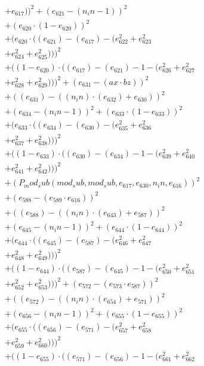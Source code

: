 \documentclass[10pt, a4paper]{article}
\begin{document}
\begin{align*}
& + e_{617}))^{2} + (e_{621} - (n_in - 1))^{2} \\
& + (e_{620}  \cdot  (1 - e_{620}))^{2} \\
& + (e_{620}  \cdot  ((e_{621}) - (e_{617}) - (e_{622}^{2} + e_{623}^{2} \\
& + e_{624}^{2} + e_{625}^{2})))^{2} \\
& + ((1 - e_{620})  \cdot  ((e_{617}) - (e_{621}) - 1 - (e_{626}^{2} + e_{627}^{2} \\
& + e_{628}^{2} + e_{629}^{2})))^{2} + (e_{631} - (ax  \cdot  bz))^{2} \\
& + ((e_{631}) - ((n_in)  \cdot  (e_{632}) + e_{630}))^{2} \\
& + (e_{634} - (n_in - 1))^{2} + (e_{633}  \cdot  (1 - e_{633}))^{2} \\
& + (e_{633}  \cdot  ((e_{634}) - (e_{630}) - (e_{635}^{2} + e_{636}^{2} \\
& + e_{637}^{2} + e_{638}^{2})))^{2} \\
& + ((1 - e_{633})  \cdot  ((e_{630}) - (e_{634}) - 1 - (e_{639}^{2} + e_{640}^{2} \\
& + e_{641}^{2} + e_{642}^{2})))^{2} \\
& + (P_mod_sub(mod_sub, mod_sub, e_{617}, e_{630}, n_in, e_{616}))^{2} \\
& + (e_{588} - (e_{589}  \cdot  e_{616}))^{2} \\
& + ((e_{588}) - ((n_in)  \cdot  (e_{643}) + e_{587}))^{2} \\
& + (e_{645} - (n_in - 1))^{2} + (e_{644}  \cdot  (1 - e_{644}))^{2} \\
& + (e_{644}  \cdot  ((e_{645}) - (e_{587}) - (e_{646}^{2} + e_{647}^{2} \\
& + e_{648}^{2} + e_{649}^{2})))^{2} \\
& + ((1 - e_{644})  \cdot  ((e_{587}) - (e_{645}) - 1 - (e_{650}^{2} + e_{651}^{2} \\
& + e_{652}^{2} + e_{653}^{2})))^{2} + (e_{572} - (e_{573}  \cdot  e_{587}))^{2} \\
& + ((e_{572}) - ((n_in)  \cdot  (e_{654}) + e_{571}))^{2} \\
& + (e_{656} - (n_in - 1))^{2} + (e_{655}  \cdot  (1 - e_{655}))^{2} \\
& + (e_{655}  \cdot  ((e_{656}) - (e_{571}) - (e_{657}^{2} + e_{658}^{2} \\
& + e_{659}^{2} + e_{660}^{2})))^{2} \\
& + ((1 - e_{655})  \cdot  ((e_{571}) - (e_{656}) - 1 - (e_{661}^{2} + e_{662}^{2} \\

\end{align*}
\end{document}
